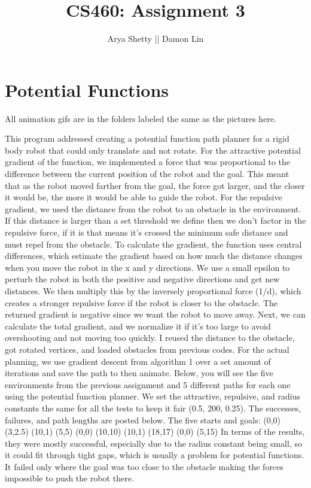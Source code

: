 \documentclass{article}
\title{CS460: Assignment 3}
\author{Arya Shetty || Damon Lin}
\begin{document}
\maketitle

\section{Potential Functions}
All animation gifs are in the folders labeled the same as the pictures here.

This program addressed creating a potential function path planner for a rigid body robot that could only translate and not rotate. For the attractive potential gradient of the function, we implemented a force that was proportional to the difference between the current position of the robot and the goal. This meant that as the robot moved farther from the goal, the force got larger, and the closer it would be, the more it would be able to guide the robot. For the repulsive gradient, we used the distance from the robot to an obstacle in the environment. If this distance is larger than a set threshold we define then we don't factor in the repulsive force, if it is that means it's crossed the minimum safe distance and must repel from the obstacle. To calculate the gradient, the function uses central differences, which estimate the gradient based on how much the distance changes when you move the robot in the x and y directions. We use a small epsilon to perturb the robot in both the positive and negative directions and get new distances. We then multiply this by the inversely proportional force (1/d), which creates a stronger repulsive force if the robot is closer to the obstacle. The returned gradient is negative since we want the robot to move away. Next, we can calculate the total gradient, and we normalize it if it's too large to avoid overshooting and not moving too quickly. I reused the distance to the obstacle, got rotated vertices, and loaded obstacles from previous codes. For the actual planning, we use gradient descent from algorithm 1 over a set amount of iterations and save the path to then animate. Below, you will see the five environments from the previous assignment and 5 different paths for each one using the potential function planner. We set the attractive, repulsive, and radius constants the same for all the tests to keep it fair (0.5, 200, 0.25). The successes, failures, and path lengths are posted below. The five starts and goals:\newline
(0,0) (3,2.5) \newline
(10,1) (5,5) \newline
(0,0) (10,10) \newline
(10,1) (18,17) \newline
(0,0) (5,15)\newline
In terms of the results, they were mostly successful, especially due to the radius constant being small, so it could fit through tight gaps, which is usually a problem for potential functions. It failed only where the goal was too close to the obstacle making the forces impossible to push the robot there.
\end{document}
